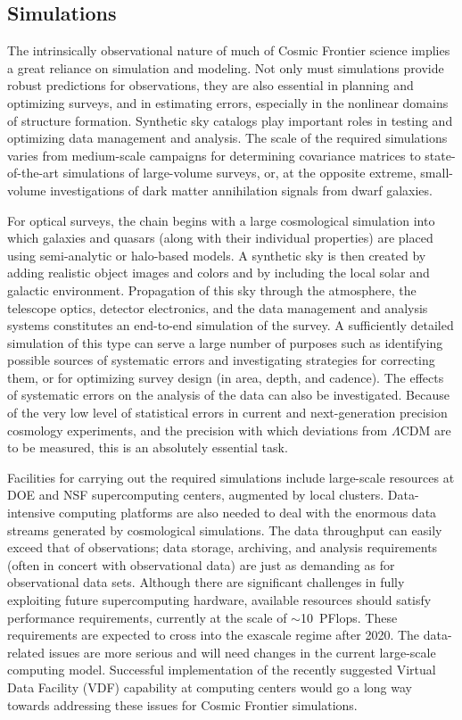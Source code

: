 \subsection{Simulations}
The intrinsically observational nature of much of Cosmic Frontier
science implies a great reliance on simulation and modeling. Not only
must simulations provide robust predictions for observations, they are
also essential in planning and optimizing surveys, and in estimating
errors, especially in the nonlinear domains of structure
formation. Synthetic sky catalogs play important roles in testing and
optimizing data management and analysis. The scale of the required
simulations varies from medium-scale campaigns for determining
covariance matrices to state-of-the-art simulations of large-volume
surveys, or, at the opposite extreme, small-volume investigations of
dark matter annihilation signals from dwarf galaxies.

For optical surveys, the chain begins
with a large cosmological simulation into which galaxies and quasars
(along with their individual properties) are placed using
semi-analytic or halo-based models. A synthetic sky is then created by
adding realistic object images and colors and by including the local
solar and galactic environment. Propagation of this sky through the
atmosphere, the telescope optics, detector electronics, and the data
management and analysis systems constitutes an end-to-end simulation
of the survey. A sufficiently detailed simulation of this type can
serve a large number of purposes such as identifying possible sources
of systematic errors and investigating strategies for correcting them,
or for optimizing survey design (in area, depth, and cadence). The
effects of systematic errors on the analysis of the data can also be
investigated. Because of the very low level of statistical errors in
current and next-generation precision cosmology experiments, and the
precision with which deviations from $\Lambda$CDM are to be measured,
this is an absolutely essential task.

Facilities for carrying out the required simulations include
large-scale resources at DOE and NSF supercomputing centers, augmented
by local clusters. Data-intensive computing platforms are also needed
to deal with the enormous data streams generated by cosmological
simulations. The data throughput can easily exceed that of
observations; data storage, archiving, and analysis requirements
(often in concert with observational data) are just as demanding as
for observational data sets. Although there are significant challenges
in fully exploiting future supercomputing hardware, available
resources should satisfy performance requirements, currently at the
scale of $\sim$10~PFlops. These requirements are expected to cross into
the exascale regime after 2020. The data-related issues are more
serious and will need changes in the current large-scale computing
model. Successful implementation of the recently suggested Virtual
Data Facility (VDF) capability at computing centers would go a long
way towards addressing these issues for Cosmic Frontier simulations.

